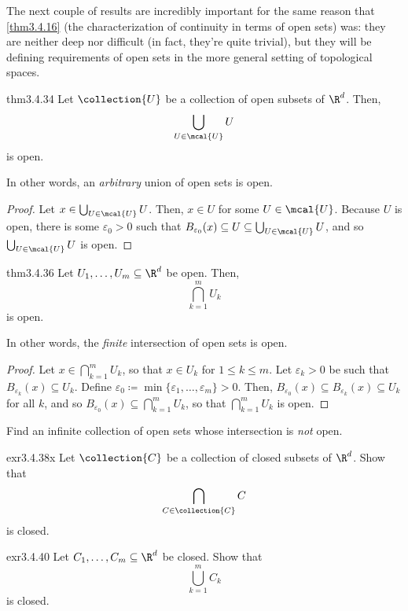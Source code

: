 The next couple of results are incredibly important for the same reason that \cref{thm3.4.16} (the characterization of continuity in terms of open sets) was:  they are neither deep nor difficult (in fact, they're quite trivial), but they will be defining requirements of open sets in the more general setting of topological spaces.
\begin{thm}{}{thm3.4.34}
Let $\collection{U}$ be a collection of open subsets of $\R ^d$.  Then,
\begin{equation}
\bigcup _{U\in \mcal{U}}U
\end{equation}
is open.
\begin{rmk}
In other words, an \emph{arbitrary} union of open sets is open.
\end{rmk}
\begin{proof}
Let $x\in \bigcup _{U\in \mcal{U}}U$.  Then, $x\in U$ for some $U\in \mcal{U}$.  Because $U$ is open, there is some $\varepsilon _0>0$ such that $B_{\varepsilon _0}(x)\subseteq U\subseteq \bigcup _{U\in \mcal{U}}U$, and so $\bigcup _{U\in \mcal{U}}U$ is open.
\end{proof}
\end{thm}
\begin{thm}{}{thm3.4.36}
Let $U_1,\ldots ,U_m\subseteq \R ^d$ be open.  Then,
\begin{equation}
\bigcap _{k=1}^mU_k
\end{equation}
is open.
\begin{rmk}
In other words, the \emph{finite} intersection of open sets is open.
\end{rmk}
\begin{proof}
Let $x\in \bigcap _{k=1}^mU_k$, so that $x\in U_k$ for $1\leq k\leq m$.  Let $\varepsilon _k>0$ be such that $B_{\varepsilon _k}(x)\subseteq U_k$.  Define $\varepsilon _0\coloneqq \min \{ \varepsilon _1,\ldots ,\varepsilon _m\} >0$.  Then, $B_{\varepsilon _0}(x)\subseteq B_{\varepsilon _k}(x)\subseteq U_k$ for all $k$, and so $B_{\varepsilon _0}(x)\subseteq \bigcap _{k=1}^mU_k$, so that $\bigcap _{k=1}^mU_k$ is open.
\end{proof}
\end{thm}
\begin{exr}{}{}
Find an infinite collection of open sets whose intersection is \emph{not} open.
\end{exr}
\begin{exr}{}{exr3.4.38x}
Let $\collection{C}$ be a collection of closed subsets of $\R ^d$.  Show that
\begin{equation}
\bigcap _{C\in \collection{C}}C
\end{equation}
is closed.
\end{exr}
\begin{exr}{}{exr3.4.40}
Let $C_1,\ldots ,C_m\subseteq \R ^d$ be closed.  Show that
\begin{equation}
\bigcup _{k=1}^mC_k
\end{equation}
is closed.
\end{exr}

